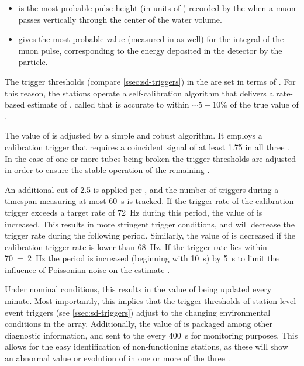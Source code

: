 \begin{itemize}
	\item \Ivem is the most probable pulse height (in units of \ADC) 
	recorded by the \WCD \PMTs when a muon passes vertically through the 
	center of the water volume.
	\item \Qvem gives the most probable value (measured in \ADC as well) 
	for the integral of the muon pulse, corresponding to the energy 
	deposited in the detector by the particle.
\end{itemize}

The trigger thresholds (compare \cref{ssec:sd-triggers}) in the \WCD are set in
terms of \Ivem. For this reason, the stations operate a self-calibration
algorithm that delivers a rate-based estimate of \Ivem, called \VemOnline that 
is accurate to within $\sim5-10\%$ \cite{bertouCalibrationSurfaceArray2006} of 
the true value of \Ivem.

The value of \VemOnline is adjusted by a simple and robust algorithm. It 
employs a calibration trigger that requires a coincident signal of at least 
\SI{1.75}{\VemOnline} in all three \LPMTs. In the case of one or more tubes
being broken the trigger thresholds are adjusted in order to ensure the stable 
operation of the remaining \PMTs 
\cite{convengaLocalStationCalibrationDummies2023}.

An additional cut of \SI{2.5}{\VemOnline} is applied per \LPMT, and the number 
of triggers during a timespan measuring at most \SI{60}{\second} is tracked. If
the trigger rate of the calibration trigger exceeds a target rate of 
\SI{72}{\hertz} during this period, the value of \VemOnline is increased. This 
results in more stringent trigger conditions, and will decrease the trigger 
rate during the following \DAQ period. Similarly, the value of \VemOnline is 
decreased if the calibration trigger rate is lower than \SI{68}{\hertz}. If the
trigger rate lies within \SI{70\pm2}{\hertz} the \DAQ period is increased 
(beginning with \SI{10}{\second}) by \SI{5}{\second} to limit the influence of 
Poissonian noise on the estimate \cite{bertouCalibrationSurfaceArray2006, 
convengaLocalStationCalibrationDummies2023}.

Under nominal conditions, this results in the value of \VemOnline being updated
every minute. Most importantly, this implies that the trigger thresholds of 
station-level event triggers (see \cref{ssec:sd-triggers}) adjust to the
changing environmental conditions in the array. Additionally, the value of 
\VemOnline is packaged among other diagnostic information, and sent to the 
\CDAS every \SI{400}{\second} for monitoring purposes. This allows for the easy
identification of non-functioning stations, as these will show an abnormal 
value or evolution of \VemOnline in one or more of the three \LPMTs. 

